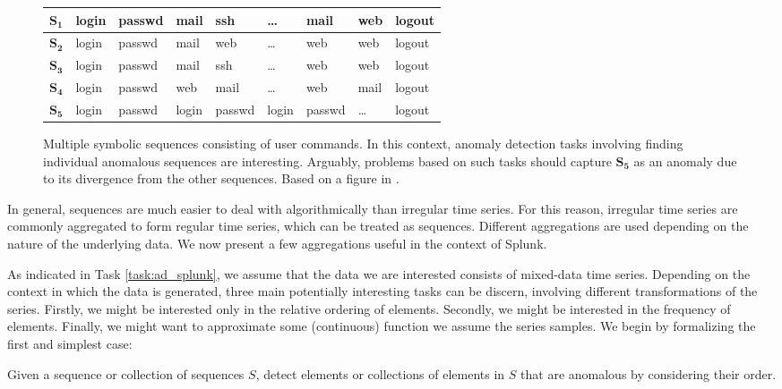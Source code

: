 \begin{figure}[htb]
    \begin{center}
        \begin{tabular}{| l | l l l l l l l l |}
            \hline
            $\mathbf{S_1}$ & login & passwd & mail & ssh & \dots & mail & web & logout \\ \hline
            $\mathbf{S_2}$ & login & passwd & mail & web & \dots & web & web & logout \\ \hline
            $\mathbf{S_3}$ & login & passwd & mail & ssh & \dots & web & web & logout \\ \hline
            $\mathbf{S_4}$ & login & passwd & web & mail & \dots & web & mail & logout \\ \hline
            $\mathbf{S_5}$ & login & passwd & login & passwd & login & passwd & \dots & logout \\\hline
        \end{tabular}
    \end{center}
    \caption{{\small Multiple symbolic sequences consisting of user commands. In this context, anomaly detection tasks involving finding individual anomalous sequences are interesting. Arguably, problems based on such tasks should capture $\mathbf{S_5}$ as an anomaly due to its divergence from the other sequences. Based on a figure in \cite{chandola2}.}}
    \label{fig:calls}
\end{figure}

In general, sequences are much easier to deal with algorithmically than irregular time series. For this reason, irregular time series are commonly aggregated to form regular time series, which can be treated as sequences. Different aggregations are used depending on the nature of the underlying data. We now present a few aggregations useful in the context of Splunk.

As indicated in Task \ref{task:ad_splunk}, we assume that the data we are interested consists of mixed-data time series. Depending on the context in which the data is generated, three main potentially interesting tasks can be discern, involving different transformations of the series. Firstly, we might be interested only in the relative ordering of elements. Secondly, we might be interested in the frequency of elements. Finally, we might want to approximate some (continuous) function we assume the series samples. We begin by formalizing the first and simplest case:

\begin{task}
  \label{task:sequential_anomaly_detection}
  Given a sequence or collection of sequences $S$, detect elements or collections of elements in $S$ that are anomalous by considering their order.
\end{task}


